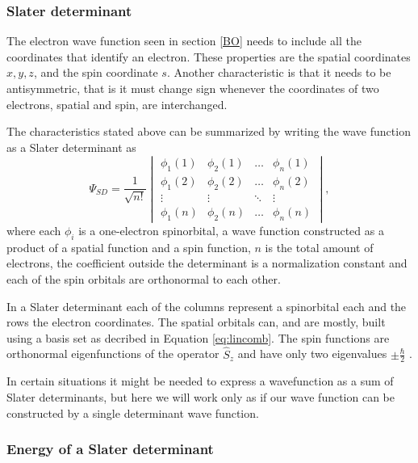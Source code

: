 \documentclass[../master_thesis.tex]{subfiles}
\begin{document}
\subsubsection{Slater determinant}
The electron wave function seen in section \ref{BO} needs to include all the
coordinates that identify an electron. These properties are the spatial coordinates
$x, y, z$, and the spin coordinate $s$. Another characteristic is that
it needs to be antisymmetric, that is it must change sign whenever the coordinates
of two electrons, spatial and spin, are interchanged.

The characteristics stated above can be summarized by writing the wave function as
a Slater determinant as \cite{Cramer:2004, Jensen:1999}
\begin{equation}
  \Psi_{SD} = \frac{1}{\sqrt{n!}}
  \begin{vmatrix}
    \phi_1(1) & \phi_2(1) & \ldots & \phi_n(1)\\
    \phi_1(2) & \phi_2(2) & \ldots & \phi_n(2)\\
    \vdots & \vdots & \ddots & \vdots \\
    \phi_1(n) & \phi_2(n) & \ldots & \phi_n(n)
  \end{vmatrix},
\end{equation}
where each $\phi_i$ is a one-electron spinorbital, a wave function constructed as
a product of a spatial function and a spin function\cite{Jensen:1999}, $n$ is the total amount of
electrons, the coefficient outside the determinant is a normalization constant
and each of the spin orbitals are orthonormal to each other.

In a Slater determinant each of the columns represent a spinorbital each and the rows the electron coordinates.
The spatial orbitals can, and are mostly, built using a basis set as decribed in
Equation \ref{eq:lincomb}. The spin functions are orthonormal eigenfunctions of the operator $\hat{S}_z$
and have only two eigenvalues $\pm \frac{\hbar}{2}$ \cite{Cramer:2004}.

In certain situations it might be needed to express a wavefunction as a sum of Slater
determinants, but here we will work only as if our wave function can be constructed by
a single determinant wave function.

\subsubsection{Energy of a Slater determinant}
\end{document}
